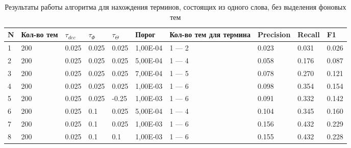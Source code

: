 \documentclass[a4paper, 12pt]{article}
\begin{document}
    \begin{table}[!ht]
    \caption{Результаты работы алгоритма для нахождения терминов, состоящих из одного слова, без выделения фоновых тем}
    \label{table:Res_1}
    \centering\medskip
    \begin{tabular}{|l|p{40 pt}|l|l|l|l|p{50 pt}|l|l|l|}
    \hline
        N & Кол-во тем & $\tau_{dec}$ & $\tau_{\Phi}$ & $\tau_{\Theta}$ & Порог & Кол-во тем для термина & Precision & Recall & F1 \\ \hline
        1 & 200 & 0.025 & 0.025 & 0.025 & 1,00E-04 & 1 — 2 & 0.023 & 0.031 & 0.026 \\ \hline
        2 & 200 & 0.025 & 0.025 & 0.025 & 5,00E-04 & 1 — 4 & 0.058 & 0.176 & 0.087 \\ \hline
        3 & 200 & 0.025 & 0.025 & 0.025 & 7,00E-04 & 1 — 5 & 0.078 & 0.270 & 0.121 \\ \hline
        4 & 200 & 0.025 & 0.025 & 0.025 & 1,00E-03 & 1 — 6 & 0.098 & 0.354 & 0.154 \\ \hline
        5 & 200 & 0.025 & 0.025 & -0.25 & 1,00E-03 & 1 — 6 & 0.091 & 0.332 & 0.142 \\ \hline
        6 & 200 & 0.025 & 0.1 & 0.025 & 5,00E-04 & 1 — 4 & 0.104 & 0.345 & 0.160 \\ \hline
        7 & 200 & 0.025 & 0.1 & 0.025 & 1,00E-03 & 1 — 6 & 0.156 & 0.432 & 0.229 \\ \hline
        8 & 200 & 0.025 & 0.1 & 0.1 & 1,00E-03 & 1 — 6 & 0.155 & 0.432 & 0.228 \\ \hline

    \end{tabular}
\end{table}
\end{document}
